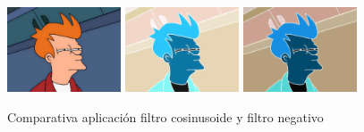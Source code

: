  \vskip0.3cm
\begin{figure}[H]
 \centering
  \includegraphics[width=0.3\textwidth]{imagenes/fry.jpg}
  \includegraphics[width=0.3\textwidth]{imagenes/fryCos.jpg}
  \includegraphics[width=0.3\textwidth]{imagenes/fryNegativo.jpg}
 \caption{Comparativa aplicación filtro cosinusoide y filtro negativo}
 \label{diseño}
 \end{figure}
